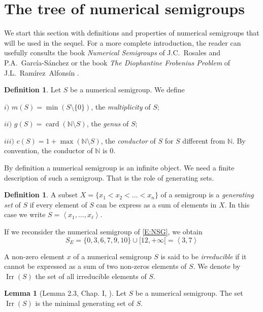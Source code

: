 \documentclass[reqno,11pt]{amsart}
\theoremstyle{plain}
\theoremstyle{definition}
\newtheorem{defi}[prop]{Definition}
\newtheorem{lem}[prop]{Lemma}
\newcommand{\NN}{\mathbb{N}}
\DeclareMathOperator{\Irr}{Irr}
\DeclareMathOperator{\card}{card}
\begin{document}
\section{The tree of numerical semigroups}
\label{S:Tree}

We start this section with definitions and properties of numerical semigroups that will be used in the sequel.
For a more complete introduction, the reader can usefully consults the book \emph{Numerical Semigroups} of J.C.~Rosales and P.A.~Garc\'ia-S\'anchez \cite{BookNS} or the book \emph{The Diophantine Frobenius Problem} of J.L.~Ram\'irez~Alfons\'in \cite{BookDFP}.

\begin{defi}
Let $S$ be a numerical semigroup. We define 

$i)$ $m(S)=\min(S\setminus\{0\})$, the \emph{multiplicity} of $S$;

$ii)$ $g(S)=\card(\NN\setminus S)$, the \emph{genus} of $S$;

$iii)$ $c(S)=1+\max(\NN\setminus S)$, the \emph{conductor} of $S$ for $S$ different from $\NN$. By convention, the conductor of $\NN$ is $0$. 
\end{defi}

By definition a numerical semigroup is an infinite object. 
We need a finite description of such a semigroup. 
That is the role of generating sets.


\begin{defi}
A subset $X=\{x_1<x_2<...<x_n\}$ of a semigroup is a \emph{generating set} of $S$ if every element of $S$ can be express as a sum of elements in $X$. 
In this case we write $S=\left<x_1,...,x_\ell\right>$.
\end{defi}

If we reconsider the numerical semigroup of \eqref{E:NSG}, we obtain
\begin{equation}
\label{E:GNSG}
S_E=\{0,3,6,7,9,10\}\cup[12,+\infty[=\left<3,7\right>
\end{equation}


A non-zero element $x$ of a numerical semigroup $S$ is said to be \emph{irreducible} if it cannot be expressed as a sum of two non-zeros elements of $S$.  
We denote by $\Irr(S)$ the set of all irreducible elements of $S$.

\begin{lem}[Lemma 2.3, Chap. I, \cite{BookNS}]
Let $S$ be a numerical semigroup. The set $\Irr(S)$ is the minimal generating set of $S$.
\end{lem} 
\end{document}
